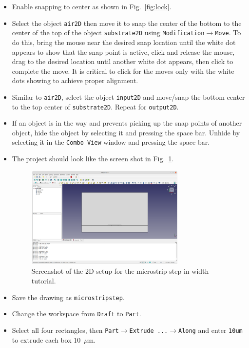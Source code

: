 \documentclass[titlepage]{article}
\renewcommand\_{\textunderscore\linebreak[1]}
\begin{document}
\begin{itemize}
\item Enable snapping to center as shown in Fig.~\ref{fig:lock}.
\item Select the object \texttt{air2D} then move it to snap the center of the bottom to the center of the top of the object \texttt{substrate2D} using \texttt{Modification}$\rightarrow$\texttt{Move}.  To do this, bring the mouse near the desired snap location until the white dot appears to show that the snap point is active, click and release the mouse, drag to the desired location until another white dot appears, then click to complete the move.  It is critical to click for the moves only with the white dots showing to achieve proper alignment.
\item Similar to \texttt{air2D}, select the object \texttt{input2D} and move/snap the bottom center to the top center of \texttt{substrate2D}.  Repeat for \texttt{output2D}.
\item If an object is in the way and prevents picking up the snap points of another object, hide the object by selecting it and pressing the space bar.  Unhide by selecting it in the \texttt{Combo View} window and pressing the space bar.
\item The project should look like the screen shot in Fig.~\ref{fig:microstrip2D}.
\begin{figure}
  \centering
  \includegraphics[width=0.75\textwidth]{../tutorials/OpenParEM3D/microstrip_step/screenshots/microstrip2D}
  \caption{Screenshot of the 2D setup for the microstrip-step-in-width tutorial.}
  \label{fig:microstrip2D}
\end{figure}
\item Save the drawing as \texttt{microstrip\_step}.
\item Change the workspace from \texttt{Draft} to \texttt{Part}.
\item Select all four rectangles, then \texttt{Part}$\rightarrow$\texttt{Extrude ...}$\rightarrow$\texttt{Along} and enter \texttt{10um} to extrude each box 10~$\mu$m.

\end{itemize}
\end{document}
